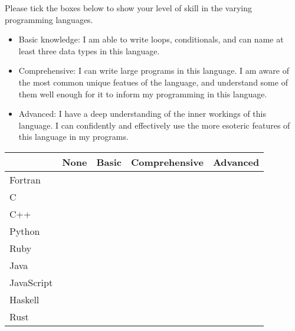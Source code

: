\documentclass[11pt]{article} %
\begin{document}
\begin{exercise}
Please tick the boxes below to show your level of skill in the varying programming languages.

\begin{itemize}
  \item Basic knowledge: I am able to write loops, conditionals, and can name at least three data types in this language.
  \item {Comprehensive:} I can write large programs in this language. I am aware of the most common unique featues of the language, and understand some of them well enough for it to inform my programming in this language.
  \item {Advanced:} I have a deep understanding of the inner workings of this language. I can confidently and effectively use the more esoteric features of this language in my programs.

\end{itemize}

\begin{center}
\begin{tabular}{|l|c|c|c|c|}
\hline
& None & Basic & Comprehensive & Advanced \\ \hline
Fortran & & & & \\ \hline
C & & & & \\ \hline
C++ & & & & \\ \hline
Python & & & & \\ \hline
Ruby & & & & \\ \hline
Java & & & & \\ \hline
JavaScript & & & & \\ \hline
Haskell & & & & \\ \hline
Rust  & & & & \\ \hline
\end{tabular}
\end{center}

\end{exercise}
\end{document}

